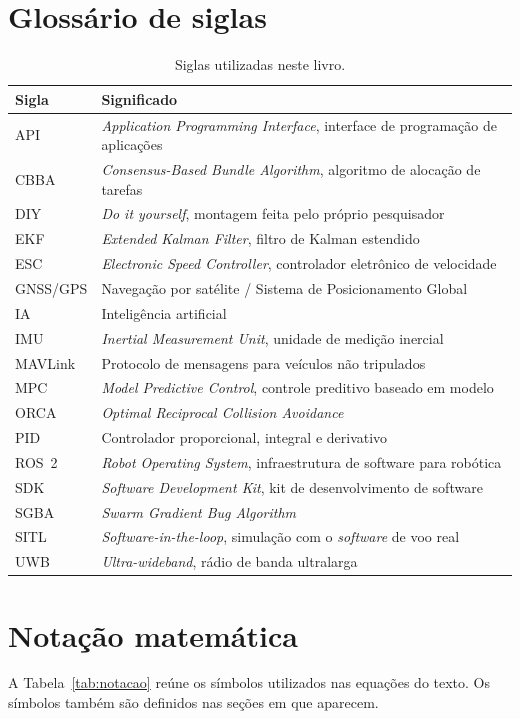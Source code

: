 \documentclass[11pt,a4paper,oneside]{book}
\numberwithin{equation}{chapter}
\begin{document}
\chapter{Glossário de siglas}\label{ap:glossario}
\begin{table}[htbp]
\centering\small
\caption{Siglas utilizadas neste livro.}
\label{tab:glossario}
\begin{tabularx}{\textwidth}{@{}>{\raggedright\arraybackslash}p{2.5cm}Y@{}}
\toprule
Sigla & Significado \\
\midrule
API & \emph{Application Programming Interface}, interface de programação de aplicações \\
CBBA & \emph{Consensus-Based Bundle Algorithm}, algoritmo de alocação de tarefas \\
DIY & \emph{Do it yourself}, montagem feita pelo próprio pesquisador \\
EKF & \emph{Extended Kalman Filter}, filtro de Kalman estendido \\
ESC & \emph{Electronic Speed Controller}, controlador eletrônico de velocidade \\
GNSS/GPS & Navegação por satélite / Sistema de Posicionamento Global \\
IA & Inteligência artificial \\
IMU & \emph{Inertial Measurement Unit}, unidade de medição inercial \\
MAVLink & Protocolo de mensagens para veículos não tripulados \\
MPC & \emph{Model Predictive Control}, controle preditivo baseado em modelo \\
ORCA & \emph{Optimal Reciprocal Collision Avoidance} \\
PID & Controlador proporcional, integral e derivativo \\
ROS~2 & \emph{Robot Operating System}, infraestrutura de software para robótica \\
SDK & \emph{Software Development Kit}, kit de desenvolvimento de software \\
SGBA & \emph{Swarm Gradient Bug Algorithm} \\
SITL & \emph{Software-in-the-loop}, simulação com o \emph{software} de voo real \\
UWB & \emph{Ultra-wideband}, rádio de banda ultralarga \\
\bottomrule
\end{tabularx}
\end{table}

\chapter{Notação matemática}\label{ap:notacao}
A Tabela~\ref{tab:notacao} reúne os símbolos utilizados nas equações do texto. Os símbolos também são definidos nas seções em que aparecem.
\end{document}
